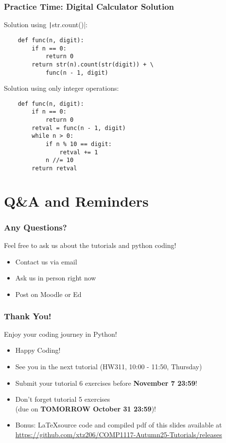 \documentclass{beamer}
\newcommand{\python}[1]{\texttt|#1|}
\begin{document}
\begin{frame}[fragile]
    \frametitle{Practice Time: Digital Calculator Solution}

    Solution using \python{str.count()}:
    \begin{verbatim}
    def func(n, digit):
        if n == 0:
            return 0
        return str(n).count(str(digit)) + \
            func(n - 1, digit)
    \end{verbatim}

    Solution using only integer operations:
    \begin{verbatim}
    def func(n, digit):
        if n == 0:
            return 0
        retval = func(n - 1, digit)
        while n > 0:
            if n % 10 == digit:
                retval += 1
            n //= 10
        return retval
    \end{verbatim}
\end{frame}

\section{Q\&A and Reminders}
\begin{frame}
    \frametitle{Any Questions?}

    Feel free to ask us about the tutorials and python coding!

    \begin{itemize}
        \item Contact us via email
        \item Ask us in person right now
        \item Post on Moodle or Ed
    \end{itemize}
\end{frame}

\begin{frame}
    \frametitle{Thank You!}

    Enjoy your coding journey in Python!

    \begin{itemize}
        \item Happy Coding!
        \item See you in the next tutorial (HW311, 10:00 - 11:50, Thursday)
        \item Submit your tutorial 6 exercises before \textbf{November 7 23:59}!
        \item Don't forget tutorial 5 exercises\\(due on \textbf{TOMORROW October 31 23:59})!
        \item Bonus: \LaTeX source code and compiled pdf of this slides available at
              \href{https://github.com/xtz206/COMP1117-Autumn25-Tutorials/releases}
              {https://github.com/xtz206/COMP1117-Autumn25-Tutorials/releases}
    \end{itemize}
\end{frame}
\end{document}
